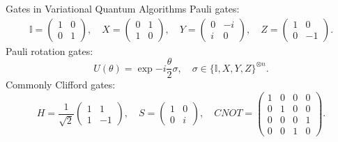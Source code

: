 \documentclass[10pt]{beamer}
\begin{document}
\begin{CJK}{UTF8}{gbsn}
\begin{frame}[fragile]{Gates in Variational Quantum Algorithms}
 Pauli gates:
  \begin{equation}
    \begin{aligned}
 \mathbb{I}=\begin{pmatrix}
        1 & 0\\
        0 & 1
      \end{pmatrix},\quad
 X=\begin{pmatrix}
        0 & 1\\
        1 & 0
      \end{pmatrix},\quad Y=\begin{pmatrix}
        0 & -i\\
 i & 0
      \end{pmatrix},\quad Z=\begin{pmatrix}
        1 & 0\\
        0 & -1
      \end{pmatrix}.
    \end{aligned}
  \end{equation}
 Pauli rotation gates:
  \begin{equation}
 U(\theta)=\exp{-i \frac{\theta}{2} \sigma},\quad \sigma\in \{\mathbb{I}, X,Y,Z\}^{\otimes n}.
  \end{equation}
 Commonly Clifford gates:
  \begin{equation}
 H=\frac{1}{\sqrt{2}}\begin{pmatrix}
      1 & 1\\
      1 & -1
    \end{pmatrix},\quad S=\begin{pmatrix}
      1 & 0\\
      0 & i
    \end{pmatrix},\quad CNOT=\begin{pmatrix}
      1 & 0 & 0 & 0\\
      0 & 1 & 0 & 0\\
      0 & 0 & 0 & 1\\
      0 & 0 & 1 & 0
    \end{pmatrix}.
  \end{equation}
\end{frame}
\end{CJK}
\end{document}
